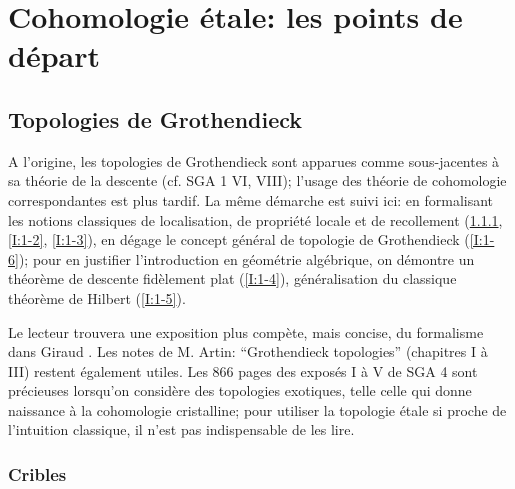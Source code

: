 
\chapter{Cohomologie étale: les points de départ}\label{I}




















\section{Topologies de Grothendieck}\label{I:1}

A l'origine, les topologies de Grothendieck sont apparues comme sous-jacentes 
à sa théorie de la descente (cf. SGA 1 VI, VIII); l'usage des théorie de 
cohomologie correspondantes est plus tardif. La même démarche est suivi 
ici: en formalisant les notions classiques de localisation, de propriété 
locale et de recollement (\ref{I:1-1}, \ref{I:1-2}, \ref{I:1-3}), en dégage le 
concept général de topologie de Grothendieck (\ref{I:1-6}); pour en justifier 
l'introduction en géométrie algébrique, on démontre un théorème 
de descente fidèlement plat (\ref{I:1-4}), généralisation du classique théorème 
de Hilbert (\ref{I:1-5}). 

Le lecteur trouvera une exposition plus compète, mais concise, du 
formalisme dans Giraud \cite{gi64}. Les notes de M. Artin: ``Grothendieck 
topologies'' \cite{ar62} (chapitres I à III) restent également utiles. Les 
866 pages des exposés I à V de SGA 4 sont précieuses lorsqu'on 
considère des topologies exotiques, telle celle qui donne naissance à la 
cohomologie cristalline; pour utiliser la topologie étale si proche de 
l'intuition classique, il n'est pas indispensable de les lire. 










\subsection{Cribles}\label{I:1-1}

